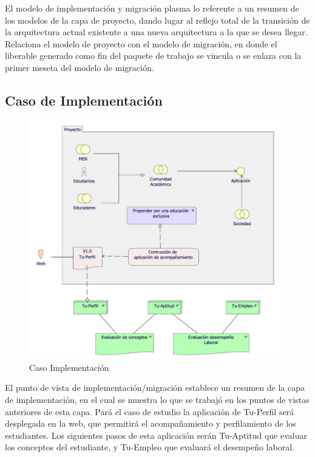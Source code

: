 El modelo de implementación y migración plasma lo referente a un resumen de los modelos de la capa de proyecto, dando lugar al reflejo total de la transición de la arquitectura actual existente a una nueva arquitectura a la que se desea llegar. Relaciona el modelo de proyecto con el modelo de migración, en donde el liberable generado como fin del paquete de trabajo se vincula o se enlaza con la primer meseta del modelo de migración.

\subsection{Caso  de Implementación}
\begin{figure}[h!]
	\centering
	\includegraphics[width=.9\linewidth]{imgs/caso/proyecto/implementacion_migracion.pdf}
	\caption{Caso Implementación}
\end{figure}
El punto de vista de implementación/migración establece un resumen de la capa de implementación, en el cual se muestra lo que se trabajó en los puntos de vistas anteriores de esta capa. Pará el caso de estudio la aplicación de Tu-Perfil será desplegada en la web, que permitirá el acompañamiento y perfilamiento de los estudiantes. Los siguientes pasos de esta aplicación serán Tu-Aptitud que evaluar los conceptos del estudiante, y Tu-Empleo que evaluará el desempeño laboral.